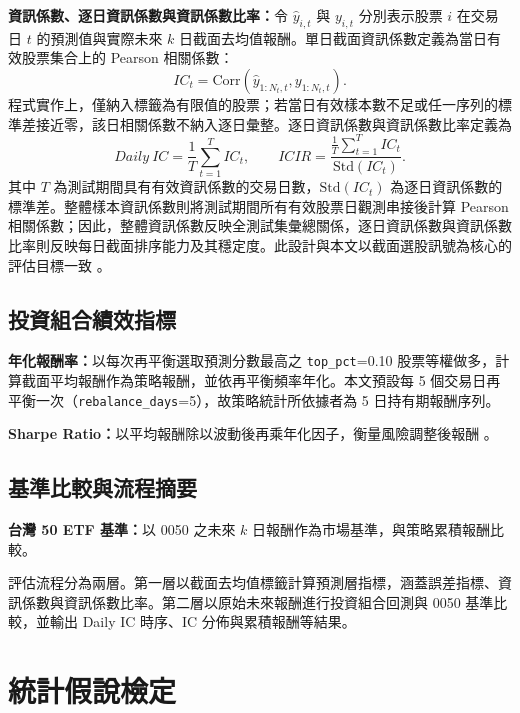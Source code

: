 \textbf{資訊係數、逐日資訊係數與資訊係數比率：}令 \(\hat{y}_{i,t}\) 與 \(y_{i,t}\) 分別表示股票 \(i\) 在交易日 \(t\) 的預測值與實際未來 \(k\) 日截面去均值報酬。單日截面資訊係數定義為當日有效股票集合上的 Pearson 相關係數：
\begin{equation}
IC_t = \mathrm{Corr}\!\left(\hat{y}_{1:N_t,t}, y_{1:N_t,t}\right).
\end{equation}
程式實作上，僅納入標籤為有限值的股票；若當日有效樣本數不足或任一序列的標準差接近零，該日相關係數不納入逐日彙整。逐日資訊係數與資訊係數比率定義為
\begin{equation}
Daily\ IC = \frac{1}{T}\sum_{t=1}^{T} IC_t,
\qquad
ICIR = \frac{\frac{1}{T}\sum_{t=1}^{T} IC_t}{\mathrm{Std}(IC_t)}.
\end{equation}
其中 \(T\) 為測試期間具有有效資訊係數的交易日數，\(\mathrm{Std}(IC_t)\) 為逐日資訊係數的標準差。整體樣本資訊係數則將測試期間所有有效股票日觀測串接後計算 Pearson 相關係數；因此，整體資訊係數反映全測試集彙總關係，逐日資訊係數與資訊係數比率則反映每日截面排序能力及其穩定度。此設計與本文以截面選股訊號為核心的評估目標一致 \cite{zhang2020information_coefficient,ding2022timevarying_ic,qian2004active_risk}。

\subsection{投資組合績效指標}
\textbf{年化報酬率：}以每次再平衡選取預測分數最高之 \texttt{top\_pct}=0.10 股票等權做多，計算截面平均報酬作為策略報酬，並依再平衡頻率年化。本文預設每 5 個交易日再平衡一次（\texttt{rebalance\_days}=5），故策略統計所依據者為 5 日持有期報酬序列。

\textbf{Sharpe Ratio：}以平均報酬除以波動後再乘年化因子，衡量風險調整後報酬 \cite{sharpe1994ratio}。

\subsection{基準比較與流程摘要}
\textbf{台灣 50 ETF 基準：}以 0050 之未來 \(k\) 日報酬作為市場基準，與策略累積報酬比較。

評估流程分為兩層。第一層以截面去均值標籤計算預測層指標，涵蓋誤差指標、資訊係數與資訊係數比率。第二層以原始未來報酬進行投資組合回測與 0050 基準比較，並輸出 Daily IC 時序、IC 分佈與累積報酬等結果。

\section{統計假說檢定}
\label{sec:stat_tests}

